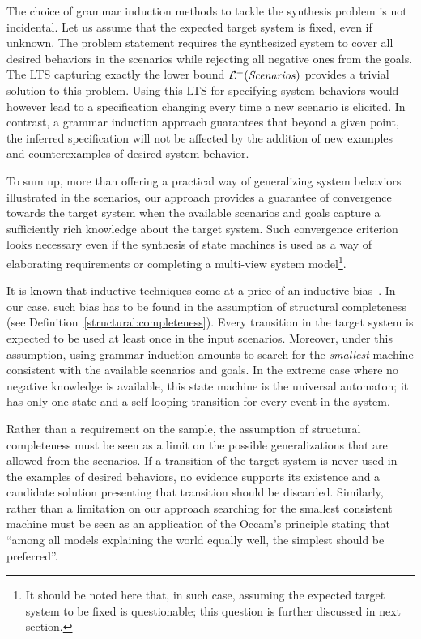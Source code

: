 The choice of grammar induction methods to tackle the synthesis problem is not incidental. Let us assume that the expected target system is fixed, even if unknown. The problem statement requires the synthesized system to cover all desired behaviors in the scenarios while rejecting all negative ones from the goals. The LTS capturing exactly the lower bound $\mathcal{L}^+(\mbox{\emph{Scenarios}})$ provides a trivial solution to this problem. Using this LTS for specifying system behaviors would however lead to a specification changing every time a new scenario is elicited. In contrast, a grammar induction approach guarantees that beyond a given point, the inferred specification will not be affected by the addition of new examples and counterexamples of desired system behavior. 

To sum up, more than offering a practical way of generalizing system behaviors illustrated in the scenarios, our approach provides a guarantee of convergence towards the target system when the available scenarios and goals capture a sufficiently rich knowledge about the target system. Such convergence criterion looks necessary even if the synthesis of state machines is used as a way of elaborating requirements or completing a multi-view system model\footnote{It should be noted here that, in such case, assuming the expected target system to be fixed is questionable; this question is further discussed in next section.}.

It is known that inductive techniques come at a price of an inductive bias~\cite{Mitchell:1980}. In our case, such bias has to be found in the assumption of structural completeness (see Definition~\ref{structural:completeness}). Every transition in the target system is expected to be used at least once in the input scenarios. Moreover, under this assumption, using grammar induction amounts to search for the \emph{smallest} machine consistent with the available scenarios and goals. In the extreme case where no negative knowledge is available, this state machine is the universal automaton; it has only one state and a self looping transition for every event in the system.

Rather than a requirement on the sample, the assumption of structural completeness must be seen as a limit on the possible generalizations that are allowed from the scenarios. If a transition of the target system is never used in the examples of desired behaviors, no evidence supports its existence and a candidate solution presenting that transition should be discarded. Similarly, rather than a limitation on our approach searching for the smallest consistent machine must be seen as an application of the Occam's principle stating that ``among all models explaining the world equally well, the simplest should be preferred''.

